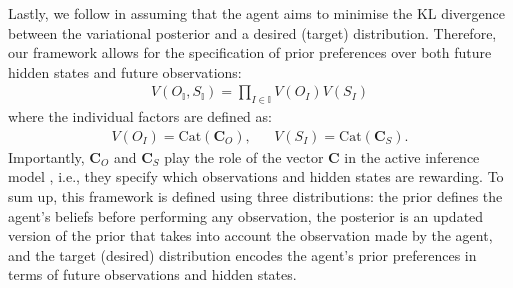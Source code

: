 \documentclass[twoside,11pt]{article}
\begin{document}
Lastly, we follow \citet{millidge2020expected} in assuming that the agent aims to minimise the KL divergence between the variational posterior and a desired (target) distribution. Therefore, our framework allows for the specification of prior preferences over both future hidden states and future observations:
\begin{align*}
V(O_{\mathbb{I}},S_{\mathbb{I}}) = \prod_{I \in \mathbb{I}} V(O_I)V(S_I)
\end{align*}
where the individual factors are defined as:
\begin{align*}
V(O_I) = \text{Cat}(\bm{C}_O),& &V(S_I) = \text{Cat}(\bm{C}_S).
\end{align*}
Importantly, $\bm{C}_O$ and $\bm{C}_S$ play the role of the vector $\bm{C}$ in the active inference model \citep{FRISTON2016862}, i.e., they specify which observations and hidden states are rewarding. To sum up, this framework is defined using three distributions: the prior defines the agent's beliefs before performing any observation, the posterior is an updated version of the prior that takes into account the observation made by the agent, and the target (desired) distribution encodes the agent's prior preferences in terms of future observations and hidden states.
\end{document}
